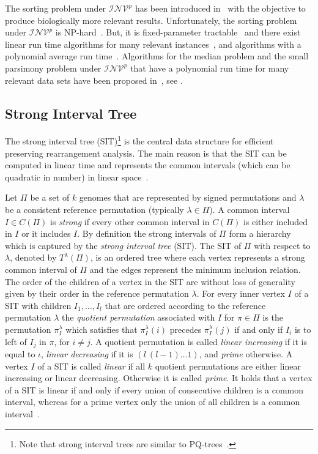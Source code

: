 \documentclass{svmult}
\newcommand{\m}[1]{\mathcal{#1}}
\begin{document}
The sorting problem under $\m{INV}^{p}$ has been introduced in~\cite{Figeac_2004} with the objective to 
produce biologically more relevant results.
%
Unfortunately, the sorting problem under $\m{INV}^{p}$ is NP-hard~\cite{Figeac_2004}. But, it is 
fixed-parameter tractable~\cite{Bouvel_2011} 
and there exist linear run time algorithms for many relevant instances~\cite{Berard_2007,Berard_2008b}, and 
algorithms with a polynomial average run time~\cite{Bouvel_2011}.
% 
Algorithms for the median problem and the small parsimony problem under $\m{INV}^{p}$ that have a polynomial run time 
for many relevant data sets have been proposed in~\cite{Bernt_2012,Bernt_2008}, see .



\subsection{Strong Interval Tree}
\label{sec:SIT}

The strong interval tree (SIT)\footnote{Note that strong interval trees are similar to PQ-trees~\cite{Booth_1976}.} is the 
central data structure for efficient preserving rearrangement analysis. The main reason is that the SIT can be computed in linear 
time and represents the common intervals (which can be quadratic in
number) in linear space~\cite{Berard_2007}.

Let $\Pi$ be a set of $k$ genomes that are represented by signed permutations and $\lambda$ be a consistent reference permutation (typically $\lambda\in\Pi$). 
A common interval $I \in C(\Pi)$ is \emph{strong} if every other common
interval in $C(\Pi)$ is either included in $I$ or it includes $I$. By
definition the strong intervals of $\Pi$ form a hierarchy which is captured by the
\emph{strong interval tree} (SIT). The SIT of $\Pi$ with respect to $\lambda$, denoted by ${T}^{\lambda}(\Pi)$, is an ordered tree where each vertex represents a strong common interval of $\Pi$ and the edges represent the minimum inclusion relation. The order of the children of a vertex in the SIT are without loss of generality given by their order in the reference permutation $\lambda$.
For every inner vertex $I$ of a SIT with children $I_1,\ldots,I_l$ that are ordered according to the reference permutation $\lambda$ the \emph{quotient permutation} associated with $I$ for $\pi\in \Pi$ is the permutation
$\pi_I^\lambda$ which satisfies that $\pi^\lambda_I(i)$ precedes
$\pi^\lambda_I(j)$ if and only if $I_i$ is to left of $I_j$ in $\pi$, for $i\neq j$.
A quotient permutation is called \emph{linear increasing} if it is equal to
$\iota$, \emph{linear decreasing} if it is $(l\ (l-1)\ldots 1)$, and \emph{prime} otherwise. 
A vertex $I$ of a SIT is called \emph{linear} if all $k$ quotient
permutations are either linear increasing or linear decreasing. Otherwise it is called \emph{prime}. It holds that a vertex
of a SIT is linear if and only if every union of consecutive children is a
common interval, whereas for a prime vertex only the union of all children
is a common interval~\cite{Berard_2007}.
\end{document}
